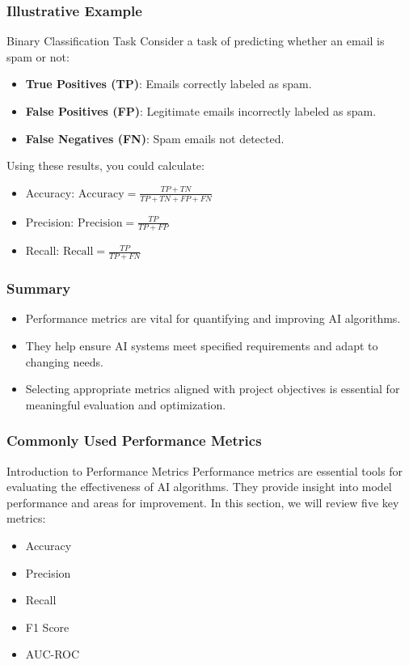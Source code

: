 \documentclass[aspectratio=169]{beamer}
\begin{document}
\begin{frame}[fragile]
    \frametitle{Illustrative Example}
    \begin{block}{Binary Classification Task}
        Consider a task of predicting whether an email is spam or not:
        \begin{itemize}
            \item \textbf{True Positives (TP)}: Emails correctly labeled as spam.
            \item \textbf{False Positives (FP)}: Legitimate emails incorrectly labeled as spam.
            \item \textbf{False Negatives (FN)}: Spam emails not detected.
        \end{itemize}
        Using these results, you could calculate:
        \begin{itemize}
            \item Accuracy: \( \text{Accuracy} = \frac{TP + TN}{TP + TN + FP + FN} \)
            \item Precision: \( \text{Precision} = \frac{TP}{TP + FP} \)
            \item Recall: \( \text{Recall} = \frac{TP}{TP + FN} \)
        \end{itemize}
    \end{block}
\end{frame}

\begin{frame}[fragile]
    \frametitle{Summary}
    \begin{itemize}
        \item Performance metrics are vital for quantifying and improving AI algorithms.
        \item They help ensure AI systems meet specified requirements and adapt to changing needs.
        \item Selecting appropriate metrics aligned with project objectives is essential for meaningful evaluation and optimization.
    \end{itemize}
\end{frame}

\begin{frame}[fragile]
    \frametitle{Commonly Used Performance Metrics}
    \begin{block}{Introduction to Performance Metrics}
        Performance metrics are essential tools for evaluating the effectiveness of AI algorithms. They provide insight into model performance and areas for improvement. In this section, we will review five key metrics: 
        \begin{itemize}
            \item Accuracy
            \item Precision
            \item Recall
            \item F1 Score
            \item AUC-ROC
        \end{itemize}
    \end{block}
\end{frame}
\end{document}
